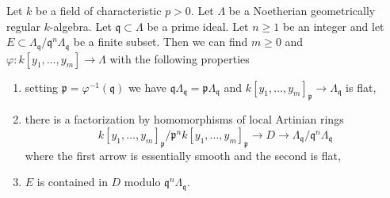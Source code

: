 \begin{lemma}
\label{lemma-solution-modulo}
Let $k$ be a field of characteristic $p > 0$.
Let $\Lambda$ be a Noetherian geometrically regular $k$-algebra.
Let $\mathfrak q \subset \Lambda$ be a prime ideal.
Let $n \geq 1$ be an integer and let
$E \subset \Lambda_\mathfrak q/\mathfrak q^n\Lambda_\mathfrak q$
be a finite subset.
Then we can find $m \geq 0$ and
$\varphi : k[y_1, \ldots, y_m] \to \Lambda$ with the following properties
\begin{enumerate}
\item setting $\mathfrak p = \varphi^{-1}(\mathfrak q)$ we have
$\mathfrak q\Lambda_\mathfrak q = \mathfrak p \Lambda_\mathfrak q$
and $k[y_1, \ldots, y_m]_\mathfrak p \to \Lambda_\mathfrak q$ is flat,
\item there is a factorization by homomorphisms of local Artinian rings
$$
k[y_1, \ldots, y_m]_\mathfrak p/\mathfrak p^n k[y_1, \ldots, y_m]_\mathfrak p
\to D \to
\Lambda_\mathfrak q/\mathfrak q^n\Lambda_\mathfrak q
$$
where the first arrow is essentially smooth and the second is flat,
\item $E$ is contained in $D$ modulo $\mathfrak q^n\Lambda_\mathfrak q$.
\end{enumerate}
\end{lemma}

